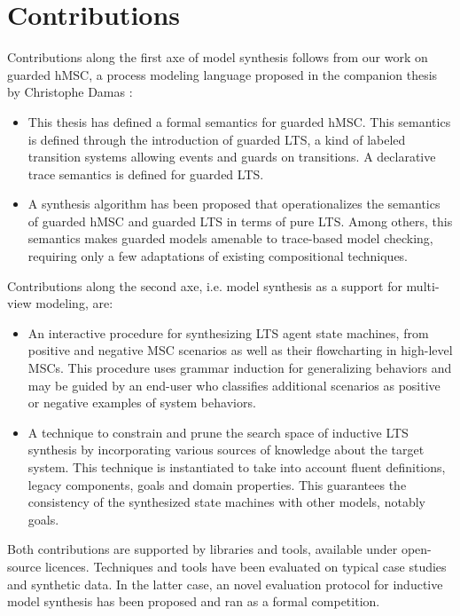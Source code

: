 \section{Contributions\label{section:conclusion-contributions}}

Contributions along the first axe of model synthesis follows from our work on guarded hMSC, a process modeling language proposed in the companion thesis by Christophe Damas \cite{Damas:2011}:

\begin{itemize}

\item This thesis has defined a formal semantics for guarded hMSC. This semantics is defined through the introduction of guarded LTS, a kind of labeled transition systems allowing events and guards on transitions. A declarative trace semantics is defined for guarded LTS.

\item A synthesis algorithm has been proposed that operationalizes the semantics of guarded hMSC and guarded LTS in terms of pure LTS. Among others, this semantics makes guarded models amenable to trace-based model checking, requiring only a few adaptations of existing compositional techniques.

\end{itemize}

Contributions along the second axe, i.e. model synthesis as a support for multi-view modeling, are:

\begin{itemize}

\item An interactive procedure for synthesizing LTS agent state machines, from positive and negative MSC scenarios as well as their flowcharting in high-level MSCs. This procedure uses grammar induction for generalizing behaviors and may be guided by an end-user who classifies additional scenarios as positive or negative examples of system behaviors.

\item A technique to constrain and prune the search space of inductive LTS synthesis by incorporating various sources of knowledge about the target system. This technique is instantiated to take into account fluent definitions, legacy components, goals and domain properties. This guarantees the consistency of the synthesized state machines with other models, notably goals. 

\end{itemize}

Both contributions are supported by libraries and tools, available under open-source licences. Techniques and tools have been evaluated on typical case studies and synthetic data. In the latter case, an novel evaluation protocol for inductive model synthesis has been proposed and ran as a formal competition.

